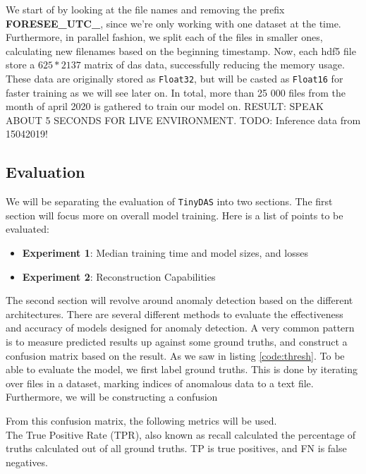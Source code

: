 We start of by looking at the file names and removing the prefix \textbf{FORESEE\_UTC\_}, since we're only working with one dataset at the time. Furthermore, in parallel fashion, we split each of the files in smaller ones, calculating new filenames based on the beginning timestamp. Now, each \acrshort{hdf5} file store a $625*2137$ matrix of \acrshort{das} data, successfully reducing the memory usage. 
These data are originally stored as \texttt{Float32}, but will be casted as \texttt{Float16} for faster training as we will see later on. In total, more than 25 000 files from the month of april 2020 is gathered to train our model on. 
RESULT: SPEAK ABOUT 5 SECONDS FOR LIVE ENVIRONMENT.
TODO: Inference data from 15042019!


\subsection{Evaluation}

We will be separating the evaluation of \texttt{TinyDAS} into two sections. The first section will focus more on overall model training. Here is a list of points to be evaluated: 

\begin{itemize}
    \item \textbf{Experiment 1}: Median training time and model sizes, and losses
    \item \textbf{Experiment 2}: Reconstruction Capabilities
\end{itemize}

The second section will revolve around anomaly detection based on the different architectures. There are several different methods to evaluate the effectiveness and accuracy of models designed for anomaly detection. A very common pattern is to measure predicted results up against some ground truths, and construct a confusion matrix based on the result. As we saw in listing \ref{code:thresh}. To be able to evaluate the model, we first label ground truths. This is done by iterating over files in a dataset, marking indices of anomalous data to a text file. Furthermore, we will be constructing a confusion 

From this confusion matrix, the following metrics will be used. \\ 


The True Positive Rate (TPR), also known as recall calculated the percentage of truths calculated out of all ground truths. TP is true positives, and FN is false negatives. 

